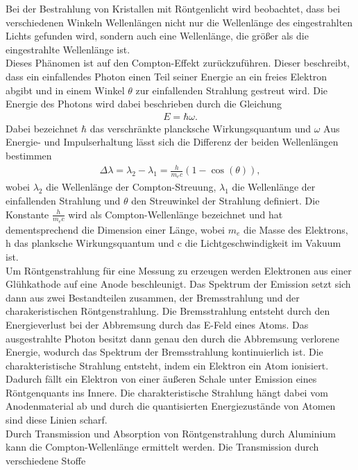 Bei der Bestrahlung von Kristallen mit Röntgenlicht wird beobachtet, dass
bei verschiedenen Winkeln Wellenlängen nicht nur die Wellenlänge des eingestrahlten Lichts gefunden wird,
sondern auch eine Wellenlänge, die größer als die eingestrahlte Wellenlänge ist.\\
Dieses Phänomen ist auf den Compton-Effekt zurückzuführen. Dieser beschreibt,
dass ein einfallendes Photon einen Teil seiner Energie an ein freies Elektron abgibt
und in einem Winkel $\theta $ zur einfallenden Strahlung gestreut wird. Die Energie des Photons wird 
dabei beschrieben durch die Gleichung 
\begin{align}
    E  = \hbar \omega \label{eq:1}.
\end{align}
Dabei bezeichnet $\hbar $ das verschränkte plancksche Wirkungsquantum und $\omega $
Aus Energie- und Impulserhaltung lässt sich die Differenz der beiden Wellenlängen bestimmen \cite{V603}
\begin{align}
    \Delta \lambda = \lambda _2 - \lambda _1 = \frac{h}{m_e c}(1-\cos(\theta))  \label{eq:2},
\end{align}
wobei $\lambda _2 $ die Wellenlänge der Compton-Streuung, $\lambda _1 $ die Wellenlänge
der einfallenden Strahlung und $\theta$ den Streuwinkel der Strahlung definiert. Die Konstante $\frac{h}{m_e c}$ wird als
Compton-Wellenlänge bezeichnet und hat dementsprechend die Dimension einer Länge,
wobei $m_e$ die Masse des Elektrons, h das planksche Wirkungsquantum und c die Lichtgeschwindigkeit im
Vakuum ist.\\
Um Röntgenstrahlung für eine Messung zu erzeugen werden Elektronen aus einer 
Glühkathode  auf eine Anode beschleunigt. Das Spektrum der Emission
setzt sich dann aus zwei Bestandteilen zusammen, der Bremsstrahlung und
der charakeristischen Röntgenstrahlung.
Die Bremsstrahlung entsteht durch den Energieverlust bei der Abbremsung durch
das E-Feld eines Atoms. Das ausgestrahlte Photon besitzt dann genau den
durch die Abbremsung verlorene Energie, wodurch das Spektrum der Bremsstrahlung kontinuierlich
ist. 
Die charakteristische Strahlung entsteht, indem ein Elektron ein Atom ionisiert.
Dadurch fällt ein Elektron von einer äußeren Schale unter Emission eines 
Röntgenquants ins Innere. Die charakteristische Strahlung hängt
dabei vom Anodenmaterial ab und durch die quantisierten Energiezustände von Atomen
sind diese Linien scharf.\\
Durch Transmission und Absorption von Röntgenstrahlung durch Aluminium kann
die Compton-Wellenlänge ermittelt werden. Die Transmission durch verschiedene Stoffe
